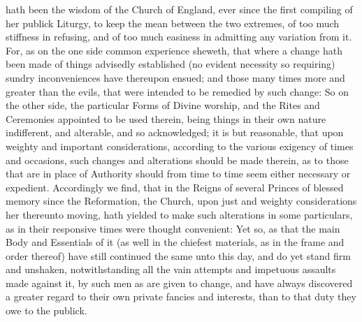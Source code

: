 
 hath been the wisdom of the Church of England, ever since the first compiling of her publick Liturgy, to keep the mean between the two extremes, of too much stiffness in refusing, and of too much easiness in admitting any variation from it. For, as on the one side common experience sheweth, that where a change hath been made of things advisedly established (no evident necessity so requiring) sundry inconveniences have thereupon ensued; and those many times more and greater than the evils, that were intended to be remedied by such change: So on the other side, the particular Forms of Divine worship, and the Rites and Ceremonies appointed to be used therein, being things in their own nature indifferent, and alterable, and so acknowledged; it is but reasonable, that upon weighty and important considerations, according to the various exigency of times and occasions, such changes and alterations should be made therein, as to those that are in place of Authority should from time to time seem either necessary or expedient. Accordingly we find, that in the Reigns of several Princes of blessed memory since the Reformation, the Church, upon just and weighty considerations her thereunto moving, hath yielded to make such alterations in some particulars, as in their responsive times were thought convenient: Yet so, as that the main Body and Essentials of it (as well in the chiefest materials, as in the frame and order thereof) have still continued the same unto this day, and do yet stand firm and unshaken, notwithstanding all the vain attempts and impetuous assaults made against it, by such men as are given to change, and have always discovered a greater regard to their own private fancies and interests, than to that duty they owe to the publick.

